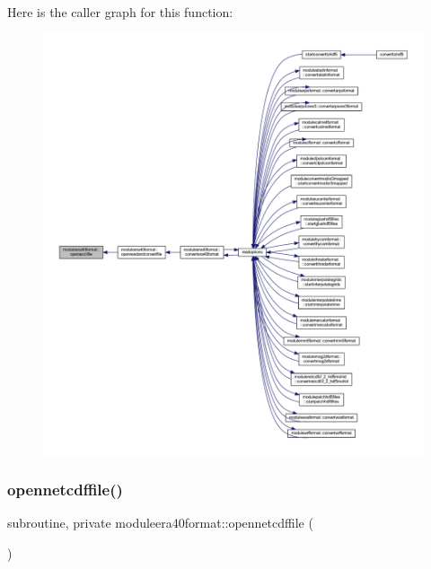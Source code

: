 Here is the caller graph for this function\+:\nopagebreak
\begin{figure}[H]
\begin{center}
\leavevmode
\includegraphics[width=350pt]{namespacemoduleera40format_aeaa93e0eaf981081d8b6a42b94714211_icgraph}
\end{center}
\end{figure}
\mbox{\label{namespacemoduleera40format_a462785fbcd7874f4f3ab321366b79ec9}} 
\subsubsection{\texorpdfstring{opennetcdffile()}{opennetcdffile()}}
{\footnotesize\ttfamily subroutine, private moduleera40format\+::opennetcdffile (\begin{DoxyParamCaption}{ }\end{DoxyParamCaption})\hspace{0.3cm}{\ttfamily [private]}}

